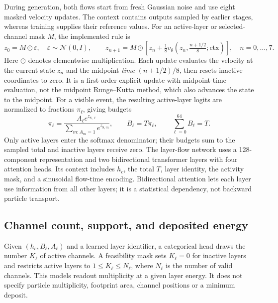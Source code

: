 \documentclass[11pt]{article}
\begin{document}
During generation, both flows start from fresh Gaussian noise and use eight masked velocity updates. The context contains outputs sampled by earlier stages, whereas training supplies their reference values. For an active-layer or selected-channel mask $M$, the implemented rule is
\begin{equation}
 z_0=M\odot\varepsilon,\quad \varepsilon\sim\mathcal N(0,I),\qquad
 z_{n+1}=M\odot\left[z_n+\tfrac18
 v_\theta\!\left(z_n,\tfrac{n+1/2}{8};\mathrm{ctx}\right)\right],
 \quad n=0,\ldots,7.
 \label{eq:flow_steps}
\end{equation}
Here $\odot$ denotes elementwise multiplication. Each update evaluates the velocity at the current state $z_n$ and the midpoint \emph{time} $(n+1/2)/8$, then resets inactive coordinates to zero. It is a first-order explicit update with midpoint-time evaluation, not the midpoint Runge--Kutta method, which also advances the state to the midpoint. For a visible event, the resulting active-layer logits are normalized to fractions $\pi_\ell$, giving budgets
\begin{equation}
 \pi_\ell=\frac{A_\ell e^{z_{8,\ell}}}
 {\sum_{m:A_m=1}e^{z_{8,m}}},\qquad
 B_\ell=T\pi_\ell,\qquad \sum_{\ell=0}^{64}B_\ell=T.
 \label{eq:layer_budget}
\end{equation}
Only active layers enter the softmax denominator; their budgets sum to the sampled total and inactive layers receive zero. The layer-flow network uses a 128-component representation and two bidirectional transformer layers with four attention heads. Its context includes $h_c$, the total $T$, layer identity, the activity mask, and a sinusoidal flow-time encoding. Bidirectional attention lets each layer use information from all other layers; it is a statistical dependency, not backward particle transport.

\subsection{Channel count, support, and deposited energy}

Given $(h_c,B_\ell,A_\ell)$ and a learned layer identifier, a categorical head draws the number $K_\ell$ of active channels. A feasibility mask sets $K_\ell=0$ for inactive layers and restricts active layers to $1\leq K_\ell\leq N_\ell$, where $N_\ell$ is the number of valid channels. This models readout multiplicity at a given layer energy. It does not specify particle multiplicity, footprint area, channel positions or a minimum deposit.
\end{document}
